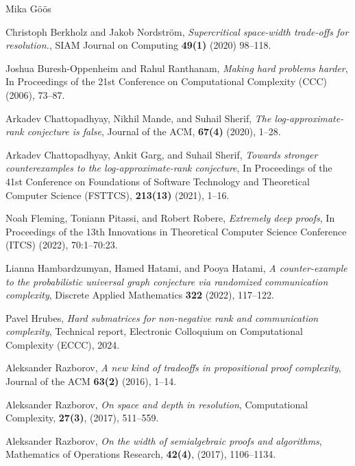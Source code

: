 \documentclass[report]{owrart}
\begin{document}
\begin{report}
\begin{talk}{Mika G\"o\"os}
\begin{thebibliography}{99}
  Christoph Berkholz and Jakob Nordstr\"om, \textit{Supercritical space-width trade-offs for resolution.}, SIAM Journal on Computing \textbf{49(1)} (2020) 98--118.
  
  Joshua Buresh-Oppenheim and Rahul Ranthanam, \textit{Making hard problems harder},  In Proceedings
  of the 21st Conference on Computational Complexity (CCC) (2006), 73--87.
  
   Arkadev Chattopadhyay, Nikhil Mande, and Suhail Sherif, \textit{The log-approximate-rank conjecture is false}, Journal of the ACM, \textbf{67(4)} (2020), 1--28.
  
   Arkadev Chattopadhyay, Ankit Garg, and Suhail Sherif, \textit{Towards stronger counterexamples to the log-approximate-rank conjecture}, In Proceedings of the 41st Conference on Foundations of Software Technology and Theoretical Computer Science (FSTTCS), \textbf{213(13)} (2021), 1--16.
  
  Noah Fleming, Toniann Pitassi, and Robert Robere, \textit{Extremely deep proofs}, In Proceedings of the 13th Innovations in Theoretical Computer Science Conference (ITCS) (2022), 70:1--70:23.
  
  Lianna Hambardzumyan, Hamed Hatami, and Pooya Hatami, \textit{A counter-example to the probabilistic universal graph conjecture via randomized communication complexity}, Discrete Applied Mathematics \textbf{322} (2022), 117--122.
  
   Pavel Hrubes, \textit{Hard submatrices for non-negative rank and communication complexity}, Technical report, Electronic Colloquium on Computational Complexity (ECCC), 2024. 
  
  Aleksander Razborov, \textit{A new kind of tradeoffs in propositional proof complexity}, Journal of the ACM \textbf{63(2)} (2016), 1--14.
  
  Aleksander Razborov, \textit{On space and depth in resolution}, Computational Complexity, \textbf{27(3)}, (2017), 511--559.
  
  Aleksander Razborov, \textit{On the width of semialgebraic proofs and algorithms}, Mathematics of Operations Research, \textbf{42(4)}, (2017), 1106--1134.
  
  
  \end{thebibliography}
  

\end{talk}
\end{report}
\end{document}
